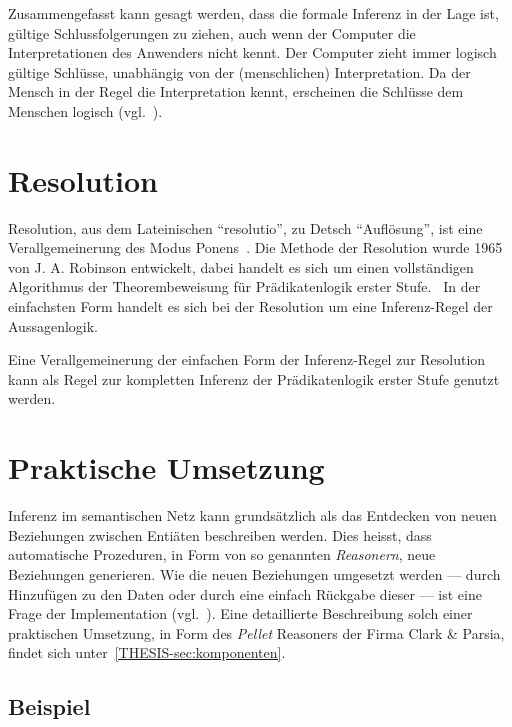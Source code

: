 Zusammengefasst kann gesagt werden, dass die formale Inferenz in der Lage ist, gültige Schlussfolgerungen zu ziehen, auch wenn der Computer die Interpretationen des Anwenders nicht kennt. Der Computer zieht immer logisch gültige Schlüsse, unabhängig von der (menschlichen) Interpretation. Da der Mensch in der Regel die Interpretation kennt, erscheinen die Schlüsse dem Menschen logisch (vgl.~\cite[S. 165]{russel}).

\section{Resolution}
\label{sec:resolution}

Resolution, aus dem Lateinischen ``resolutio'', zu Detsch ``Auflösung'', ist eine Verallgemeinerung des Modus Ponens~\cite[S. 279]{russel}. Die Methode der Resolution wurde 1965 von J. A. Robinson entwickelt, dabei handelt es sich um einen vollständigen Algorithmus der Theorembeweisung für Prädikatenlogik erster Stufe.~\cite[S. 18]{russel} In der einfachsten Form handelt es sich bei der Resolution um eine Inferenz-Regel der Aussagenlogik.~\cite[S. 277]{russel}

Eine Verallgemeinerung der einfachen Form der Inferenz-Regel zur Resolution kann als Regel zur kompletten Inferenz der Prädikatenlogik erster Stufe genutzt werden.~\cite[S. 278]{russel}

\section{Praktische Umsetzung}
\label{sec:inferenz_praktisch}

Inferenz im semantischen Netz kann grundsätzlich als das Entdecken von neuen Beziehungen zwischen Entiäten beschreiben werden. Dies heisst, dass automatische Prozeduren, in Form von so genannten \textit{Reasonern}, neue Beziehungen generieren. Wie die neuen Beziehungen umgesetzt werden --- durch Hinzufügen zu den Daten oder durch eine einfach Rückgabe dieser --- ist eine Frage der Implementation (vgl.~\cite[Abschnitt 1]{w3inference}). Eine detaillierte Beschreibung solch einer praktischen Umsetzung, in Form des \textit{Pellet} Reasoners der Firma Clark \& Parsia, findet sich unter~\ref{THESIS-sec:komponenten}.

\subsection{Beispiel}
\label{subsec:inferenz_beispiel}

